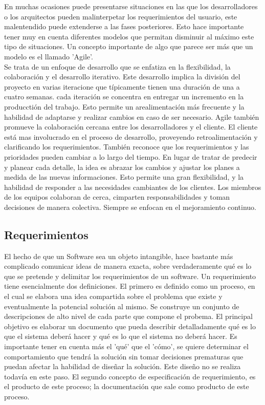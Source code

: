 En muchas ocasiones puede presentarse situaciones en las que los desarrolladores o los arquitectos pueden malinterpetar los requerimientos del usuario, este malentendido puede extenderse a las fases posteriores. Esto hace importante tener muy en cuenta diferentes modelos que permitan disminuir al máximo este tipo de situaciones. Un concepto importante de algo que parece ser más que un modelo es el llamado 'Agile'. \\

Se trata de un enfoque de desarrollo que se enfatiza en la flexibilidad, la colaboración y el desarrollo iterativo. Este desarrollo implica la división del proyecto en varias iteracione que típicamente tienen una duración de una a cuatro semanas. cada iteración se concentra en entregar un incremento en la producctión del trabajo. Esto permite un arealimentación más frecuente y la habilidad de adaptarse y realizar cambios en caso de ser necesario. Agile también promueve la colaboración cercana entre los desarrolladores y el cliente. El cliente está mas involucrado en el proceso de desarrollo, proveyendo retroalimentación y clarificando los requerimientos. También reconoce que los requerimientos y las prioridades pueden cambiar a lo largo del tiempo. En lugar de tratar de predecir y planear cada detalle, la idea es abrazar los cambios y ajustar los planes a medida de las nuevas informaciones. Esto permite una gran flexibilidad, y la habilidad de responder a las necesidades cambiantes de los clientes. Los miembros de los equipos colaboran de cerca, cimparten responsabilidades y toman decisiones de manera colectiva. Siempre se enfocan en el mejoramiento continuo. 

\subsection{Requerimientos}

El hecho de que un Software sea un objeto intangible, hace bastante más complicado comunicar ideas de manera exacta, sobre verdaderamente qué es lo que se pretende y delimitar los requerimientos de un software. Un requerimiento tiene esencialmente dos definiciones. El primero es definido como un proceso, en el cual se elabora una idea compartida sobre el problema que existe y eventualmente la potencial solución al mismo. Se construye un conjunto de descripciones de alto nivel de cada parte que compone el probema. El principal objetivo es elaborar un documento que pueda describir detalladamente qué es lo que el sistema deberá hacer y qué es lo que el sistema no deberá hacer. Es importante tener en cuenta más el 'qué' que el 'cómo', se quiere determinar el comportamiento que tendrá la solución sin tomar decisiones prematuras que puedan afectar la habilidad de diseñar la solución. Este diseño no se realiza todavía en este paso. El segundo concepto de especificación de requerimiento, es el producto de este proceso; la documentación que sale como producto de este proceso. \\

